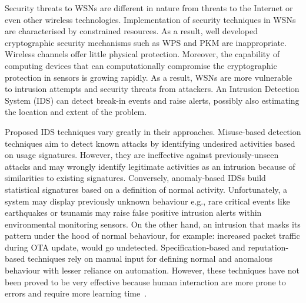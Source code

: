 \documentclass{CRPITStyle}
\renewcommand{\cite}{\citep}
\begin{document}
Security threats to WSNs are different in nature from threats to the Internet or even other wireless technologies. %
Implementation of security techniques in WSNs are characterised by constrained resources.
As a result, well developed cryptographic security mechanisms such as WPS and PKM are inappropriate.
Wireless channels offer little physical protection.
Moreover, the capability of computing devices that can computationally compromise the cryptographic protection in sensors is growing rapidly.
As a result, WSNs are more vulnerable to intrusion attempts and security threats from attackers.
An Intrusion Detection System (IDS) can detect  break-in events and raise alerts, possibly also estimating the location and extent of the problem. %


Proposed IDS techniques vary greatly in their approaches.
Misuse-based  detection  techniques aim to detect known attacks by identifying undesired activities based on usage signatures.
However, they are ineffective against previously-unseen attacks and 
may wrongly identify legitimate activities as an intrusion because of similarities to existing signatures.
Conversely, anomaly-based IDSs build statistical signatures based on a definition of normal activity.
Unfortunately, a system may display previously unknown behaviour e.g., rare critical events like earthquakes or tsunamis may raise false positive intrusion alerts within environmental monitoring sensors.
On the other hand, an intrusion that masks its pattern under the hood of normal behaviour, for example: increased packet traffic during OTA update, would go undetected.
Specification-based and reputation-based techniques rely on manual input for defining normal and anomalous behaviour with lesser reliance on automation.
However, these techniques have not been proved to be very effective because human interaction are more prone to errors and require more learning time~\cite{quing09, 1593102, 1290173, Chen:2009:NMI:1516241.1516282}. 
\end{document}
